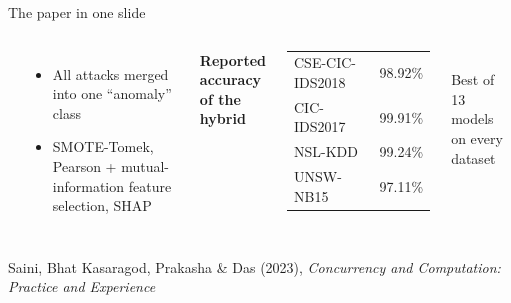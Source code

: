 \documentclass[aspectratio=169,11pt]{beamer}
\begin{document}
\begin{frame}{The paper in one slide}
\begin{columns}[c]
\begin{center}
\end{center}
\begin{itemize}\small
  \item All attacks merged into one ``anomaly'' class
  \item SMOTE-Tomek, Pearson + mutual-information feature selection, SHAP
\end{itemize}
\centering\textbf{Reported accuracy of the hybrid}\\[4pt]
\begin{tabular}{lr}
\toprule
CSE-CIC-IDS2018 & 98.92\% \\
CIC-IDS2017     & 99.91\% \\
NSL-KDD         & 99.24\% \\
UNSW-NB15       & 97.11\% \\
\bottomrule
\end{tabular}\\[6pt]
{\small Best of 13 models on every dataset}
\end{columns}
\vspace{4mm}
{\footnotesize Saini, Bhat Kasaragod, Prakasha \& Das (2023), \emph{Concurrency and Computation: Practice and Experience}}
\end{frame}
\end{document}
